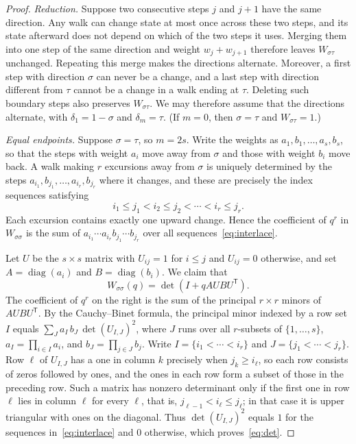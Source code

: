 \documentclass[11pt]{amsart}
\theoremstyle{remark}
\numberwithin{equation}{section}
\begin{document}
\begin{proof}
\emph{Reduction.} Suppose two consecutive steps $j$ and $j+1$ have the same
direction. Any walk can change state at most once across these two steps, and
its state afterward does not depend on which of the two steps it uses. Merging
them into one step of the same direction and weight $w_j+w_{j+1}$ therefore
leaves $W_{\sigma\tau}$ unchanged. Repeating this merge makes the directions
alternate. Moreover, a first step with direction $\sigma$ can never be a
change, and a last step with direction different from $\tau$ cannot be a change
in a walk ending at $\tau$. Deleting such boundary steps also preserves
$W_{\sigma\tau}$. We may therefore assume that the directions alternate, with
$\delta_1=1-\sigma$ and $\delta_m=\tau$. (If $m=0$, then $\sigma=\tau$ and
$W_{\sigma\tau}=1$.)

\emph{Equal endpoints.} Suppose $\sigma=\tau$, so $m=2s$. Write the weights as
$a_1,b_1,\dots,a_s,b_s$, so that the steps with weight $a_i$ move away from
$\sigma$ and those with weight $b_i$ move back. A walk making $r$ excursions
away from $\sigma$ is uniquely determined by the steps
$a_{i_1},b_{j_1},\dots,a_{i_r},b_{j_r}$ where it changes, and these are
precisely the index sequences satisfying
\begin{equation}\label{eq:interlace}
i_1\le j_1<i_2\le j_2<\cdots<i_r\le j_r.
\end{equation}
Each excursion contains exactly one upward change. Hence the coefficient of
$q^r$ in $W_{\sigma\sigma}$ is the sum of
$a_{i_1}\cdots a_{i_r}b_{j_1}\cdots b_{j_r}$ over all
sequences~\eqref{eq:interlace}.

Let $U$ be the $s\times s$ matrix with $U_{ij}=1$ for $i\le j$ and $U_{ij}=0$
otherwise, and set $A=\operatorname{diag}(a_i)$ and
$B=\operatorname{diag}(b_i)$. We claim that
\begin{equation}\label{eq:det}
W_{\sigma\sigma}(q)=\det(I+qAUBU^{\mathsf T}).
\end{equation}
The coefficient of $q^r$ on the right is the sum of the principal $r\times r$
minors of $AUBU^{\mathsf T}$. By the Cauchy--Binet formula, the principal minor
indexed by a row set $I$ equals $\sum_J a_I\,b_J\,\det(U_{I,J})^2$, where $J$
runs over all $r$-subsets of $\{1,\dots,s\}$, $a_I=\prod_{i\in I}a_i$, and
$b_J=\prod_{j\in J}b_j$. Write $I=\{i_1<\cdots<i_r\}$ and
$J=\{j_1<\cdots<j_r\}$. Row $\ell$ of $U_{I,J}$ has a one in column $k$
precisely when $j_k\ge i_\ell$, so each row consists of zeros followed by ones,
and the ones in each row form a subset of those in the preceding row. Such a
matrix has nonzero determinant only if the first one in row $\ell$ lies in
column $\ell$ for every $\ell$, that is, $j_{\ell-1}<i_\ell\le j_\ell$; in that
case it is upper triangular with ones on the diagonal. Thus $\det(U_{I,J})^2$
equals $1$ for the sequences in~\eqref{eq:interlace} and $0$ otherwise, which
proves~\eqref{eq:det}.


\end{proof}
\end{document}
